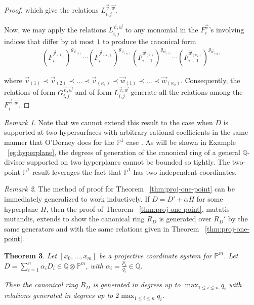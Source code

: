 \documentclass{amsart}
\theoremstyle{plain}
\newtheorem{thm}{Theorem}[section]
\theoremstyle{definition}
\theoremstyle{remark}
\newtheorem{rem}[thm]{Remark}
\numberwithin{equation}{section}
\newcommand\bq{{\mathbb Q}}
\newcommand\bp{{\mathbb P}}
\begin{document}
\begin{proof}
\noindent 
which give the relations $L_{i, j}^{\vec{v}, \vec{w}}$.

Now, we may apply the relations $L_{i, j}^{\vec{v}, \vec{w}}$
to any monomial in the $F_i^{\vec{v}}$'s involving
indices that differ by at most $1$ to produce the canonical form
\begin{align*}
	(F_i^{\vec{v}_{(1)}})^{g_{\vec{v}_{(1)}}} \cdots
	(F_i^{\vec{v}_{(\kappa_1)}})^{g_{\vec{v}_{(\kappa_1)}}}
	(F_{i + 1}^{\vec{w}_{(1)}})^{g_{\vec{w}_{(1)}}} \cdots
	(F_{i + 1}^{\vec{w}_{(\kappa_2)}})^{g_{\vec{w}_{(\kappa_2)}}}
\end{align*}

\noindent
where $\vec{v}_{(1)} \prec \vec{v}_{(2)} \prec \ldots \prec
\vec{v}_{(\kappa_1)} \prec \vec{w}_{(1)} \prec \ldots \prec
\vec{w}_{(\kappa_2)}$. Consequently, the relations of form
$G_{i, j}^{\vec{v}, \vec{w}}$ and of form $L_{i, j}^{\vec{v},
\vec{w}}$ generate all the relations among the $F_{i}^{\vec{v},
\vec{w}}$.
\end{proof}

\begin{rem}
\label{rem:proj-two-points}
Note that we cannot extend this result to the case when
$D$ is supported at two hypersurfaces with arbitrary rational
coefficients in the same manner that O'Dorney does for the
$\bp^1$ case \cite[Section 4]{dorney:canonical}. As will be shown
in Example ~\ref{eg:hyperplane}, the degrees of generation of the
canonical ring of a general $\bq$-divisor supported on two
hyperplanes cannot be bounded so tightly. The two-point
$\bp^1$ result leverages the fact that $\bp^1$ has two
independent coordinates.
\end{rem}

\begin{rem}
\label{rem:proj-one-point-ind}
The method of proof for Theorem ~\ref{thm:proj-one-point}
can be immediately generalized to work inductively. If $D = D' + \alpha H$
for some hyperplane $H$, then the proof of Theorem ~\ref{thm:proj-one-point}, mutatis mutandis, extends to show
the canonical ring $R_D$ is generated over $R_D'$ by the same
generators and with the same relations given in Theorem
~\ref{thm:proj-one-point}.
\end{rem}
\begin{thm}
\label{thm:proj-effective}
Let $[x_0, \ldots, x_m]$ be a projective coordinate system for
$\bp^m$. Let $D = \sum_{i = 1}^{n} \alpha_i D_i \in \bq \otimes \bp^m$, with $\alpha_i =
\frac{p_i}{q_i} \in \bq$.

Then the canonical ring
$R_D$
is generated in degrees up to $\max_{1 \leq i \leq n}{q_i}$ with
relations generated in degrees up to $2 \max_{1 \leq i \leq n}{q_i}$.
\end{thm}
\end{document}
